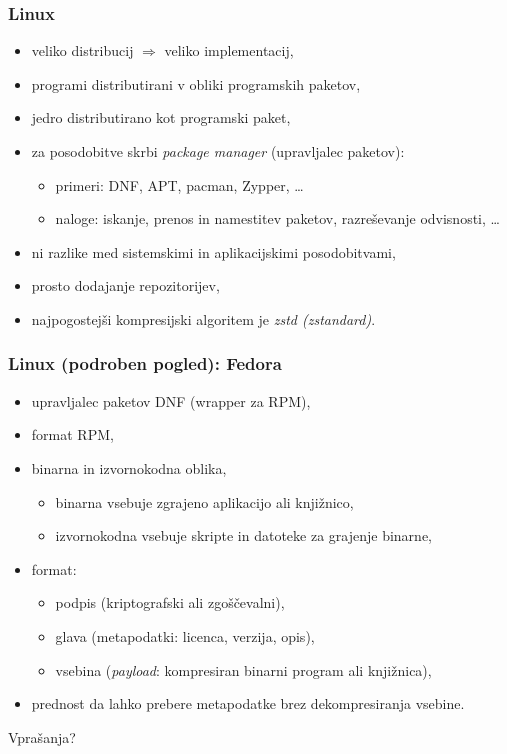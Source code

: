 \documentclass[aspectratio=169]{beamer}
\begin{document}
    \begin{frame}
        \frametitle{Linux}
        \begin{itemize}
            \item veliko distribucij \( \Rightarrow \) veliko implementacij,
            \item programi distributirani v obliki programskih paketov,
            \item jedro distributirano kot programski paket,
            \item za posodobitve skrbi \emph{package manager} (upravljalec paketov):
            \begin{itemize}
                \item primeri: DNF, APT, pacman, Zypper, \ldots
                \item naloge: iskanje, prenos in namestitev paketov, razreševanje odvisnosti, \ldots
            \end{itemize}
            \item ni razlike med sistemskimi in aplikacijskimi posodobitvami,
            \item prosto dodajanje repozitorijev,
            \item najpogostejši kompresijski algoritem je \emph{zstd (zstandard)}.
        \end{itemize}
    \end{frame}

    \begin{frame}
        \frametitle{Linux (podroben pogled): Fedora}
        \begin{itemize}
            \item upravljalec paketov DNF (wrapper za RPM),
            \item format RPM,
            \item binarna in izvornokodna oblika,
            \begin{itemize}
                \item binarna vsebuje zgrajeno aplikacijo ali knjižnico,
                \item izvornokodna vsebuje skripte in datoteke za grajenje binarne,
            \end{itemize}
            \item format:
            \begin{itemize}
                \item podpis (kriptografski ali zgoščevalni),
                \item glava (metapodatki: licenca, verzija, opis),
                \item vsebina (\emph{payload}: kompresiran binarni program ali knjižnica),
            \end{itemize}
            \item prednost da lahko prebere metapodatke brez dekompresiranja vsebine.
        \end{itemize}
    \end{frame}

    \begin{frame}[plain,c]
       \begin{center}
            Vprašanja?
       \end{center}
    \end{frame}
\end{document}
